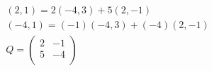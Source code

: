\documentclass[12pt]{article}
\newenvironment{problem}[2][Problem]{\begin{trivlist}
\item[\hskip \labelsep {\bfseries #1}\hskip \labelsep {\bfseries #2.}]}{\end{trivlist}}
\begin{document}
\begin{problem}{2.d}
\end{problem}
\begin{gather*}
	(2, 1) = 2(-4,3) + 5(2, -1) \\
	(-4, 1) = (-1)(-4,3) + (-4)(2, -1) \\
	Q= \left( \begin{array}{cc} 
		2 & -1\\
		5 & -4\\
	\end{array} \right) 
\end{gather*}
\filbreak
\end{document}
